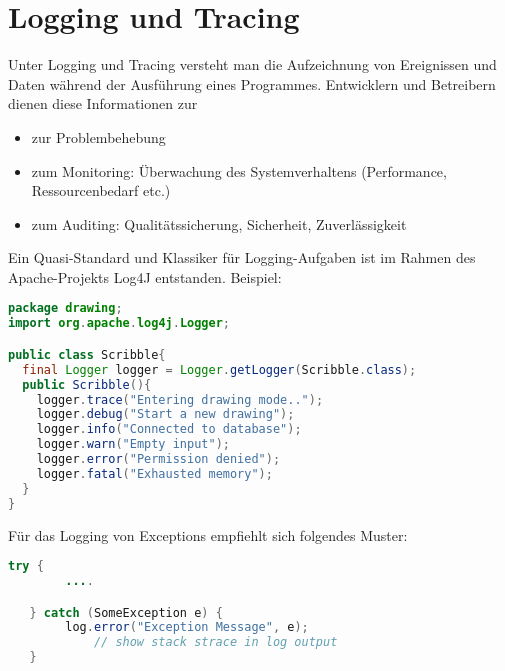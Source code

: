 \section{Logging und Tracing}
Unter Logging und Tracing versteht man die Aufzeichnung von
Ereignissen und Daten während der Ausführung eines Programmes.
Entwicklern und Betreibern dienen diese Informationen zur
\begin{itemize}
\item zur Problembehebung
\item zum Monitoring: Überwachung des Systemverhaltens (Performance,
      Ressourcenbedarf etc.)
\item zum Auditing: Qualitätssicherung, Sicherheit, Zuverlässigkeit
\end{itemize}
Ein Quasi-Standard und Klassiker für Logging-Aufgaben
ist im Rahmen des Apache-Projekts Log4J entstanden.
\newpage
 Beispiel:
\begin{lstlisting}[language=java]
package drawing;
import org.apache.log4j.Logger;

public class Scribble{
  final Logger logger = Logger.getLogger(Scribble.class);
  public Scribble(){
    logger.trace("Entering drawing mode..");
    logger.debug("Start a new drawing");
    logger.info("Connected to database");
    logger.warn("Empty input");
    logger.error("Permission denied");
    logger.fatal("Exhausted memory");
  }
}
\end{lstlisting}
Für das Logging von Exceptions empfiehlt sich folgendes Muster:
\begin{lstlisting}[language=java]
  try {
	    ....

   } catch (SomeException e) {
	    log.error("Exception Message", e);
			// show stack strace in log output
   }
\end{lstlisting}
